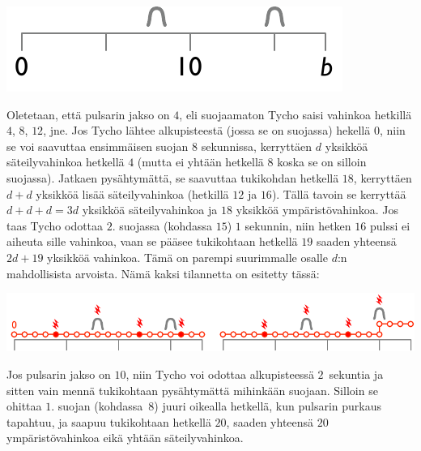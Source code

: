 \includegraphics[width=.3\textwidth]{img/samplesetup}

Oletetaan, että pulsarin jakso on $4$, eli suojaamaton Tycho saisi vahinkoa 
hetkillä $4$, $8$, $12$, jne.
Jos Tycho lähtee alkupisteestä (jossa se on suojassa) hekellä $0$, niin se 
voi saavuttaa ensimmäisen suojan $8$ sekunnissa, kerryttäen $d$ yksikköä säteilyvahinkoa 
hetkellä $4$ (mutta ei yhtään hetkellä $8$ koska se on silloin suojassa).
Jatkaen pysähtymättä, se saavuttaa tukikohdan hetkellä $18$, kerryttäen $d+d$ 
yksikköä lisää säteilyvahinkoa (hetkillä $12$ ja $16$). 
Tällä tavoin se kerryttää $d+d+d=3d$ yksikköä säteilyvahinkoa ja $18$ yksikköä 
ympäristövahinkoa.
Jos taas Tycho odottaa $2.$ suojassa (kohdassa $15$) $1$ sekunnin, niin 
hetken $16$ pulssi ei aiheuta sille vahinkoa, vaan se pääsee tukikohtaan 
hetkellä $19$ saaden yhteensä $2d + 19$ yksikköä vahinkoa.
Tämä on parempi suurimmalle osalle $d$:n mahdollisista arvoista.
Nämä kaksi tilannetta on esitetty tässä:

\includegraphics[width=.8\textwidth]{img/sample1_2.pdf}

Jos pulsarin jakso on $10$, niin Tycho voi odottaa alkupisteessä $2$~sekuntia 
ja sitten vain mennä tukikohtaan pysähtymättä mihinkään suojaan.
Silloin se ohittaa $1.$ suojan (kohdassa~$8$) juuri oikealla hetkellä, 
kun pulsarin purkaus tapahtuu, ja saapuu tukikohtaan hetkellä $20$, 
saaden yhteensä $20$ ympäristövahinkoa eikä yhtään säteilyvahinkoa.


